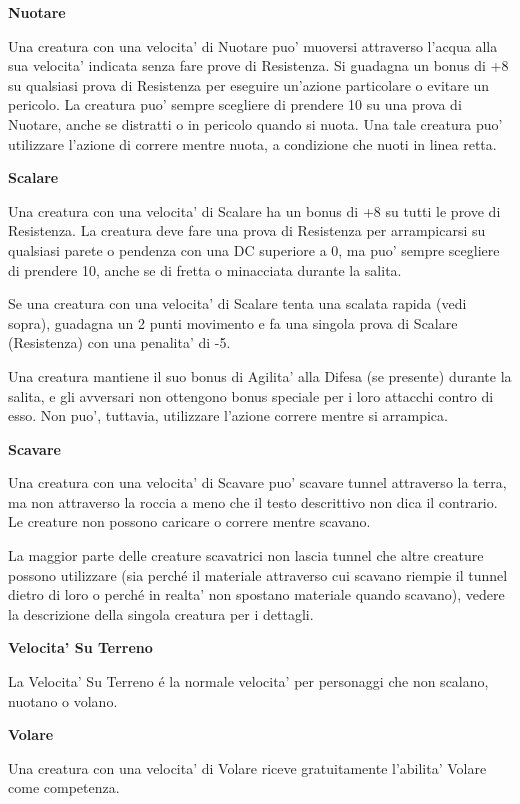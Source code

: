 \documentclass[a4paper,11pt,twoside,openany]{book}
\begin{document}
{		\textbf{Nuotare}
		
		Una creatura con una velocita' di Nuotare puo' muoversi attraverso l'acqua alla sua velocita' indicata senza fare prove di Resistenza. Si guadagna un bonus di +8 su qualsiasi prova di Resistenza per eseguire un'azione particolare o evitare un pericolo. La creatura puo' sempre scegliere di prendere 10 su una prova di Nuotare, anche se distratti o in pericolo quando si nuota. Una tale creatura puo' utilizzare l'azione di correre mentre nuota, a condizione che nuoti in linea retta.
		
		\textbf{Scalare}
		
		Una creatura con una velocita' di Scalare ha un bonus di +8 su tutti le prove di Resistenza. La creatura deve fare una prova di Resistenza per arrampicarsi su qualsiasi parete o pendenza con una DC superiore a 0, ma puo' sempre scegliere di prendere 10, anche se di fretta o minacciata durante la salita.
		
		Se una creatura con una velocita' di Scalare tenta una scalata rapida (vedi sopra), guadagna un 2 punti movimento e fa una singola prova di Scalare (Resistenza) con una penalita' di -5. 
		
		Una creatura mantiene il suo bonus di Agilita' alla Difesa (se presente) durante la salita, e gli avversari non ottengono bonus speciale per i loro attacchi contro di esso. Non puo', tuttavia, utilizzare l'azione correre mentre si arrampica.
		
		\textbf{Scavare}
		
		Una creatura con una velocita' di Scavare puo' scavare tunnel attraverso la terra, ma non attraverso la roccia a meno che il testo descrittivo non dica il contrario. Le creature non possono caricare o correre mentre scavano.
		
		La maggior parte delle creature scavatrici non lascia tunnel che altre creature possono utilizzare (sia perché il materiale attraverso cui scavano riempie il tunnel dietro di loro o perché in realta' non spostano materiale quando scavano), vedere la descrizione della singola creatura per i dettagli.
		
		\textbf{Velocita' Su Terreno}
		
		La Velocita' Su Terreno é la normale velocita' per personaggi che non scalano, nuotano o volano.
		
		\textbf{Volare}
		
		Una creatura con una velocita' di Volare riceve gratuitamente l'abilita' Volare come competenza.
		
}
\end{document}
